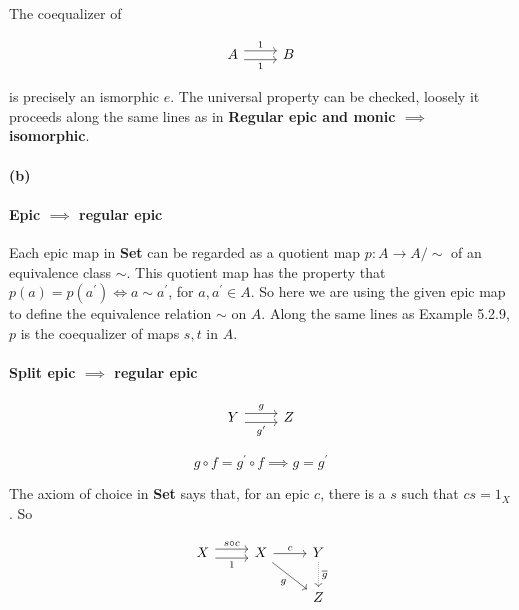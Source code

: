 \documentclass{article}
\begin{document}
The coequalizer of

\begin{equation*}
\label{eqn5143}
\begin{tikzcd}
 A \ar[r,shift left=.75ex,"1"]
   \ar[r,shift right=.75ex,swap,"1"] & B
\end{tikzcd}
\end{equation*}

is precisely an ismorphic $e$. The universal property can be checked, loosely it proceeds along the same lines as in \textbf{Regular epic and monic $\implies$ isomorphic}.

\paragraph{(b)}

\paragraph{Epic $\implies$ regular epic}

Each epic map in \textbf{Set} can be regarded as a quotient map $p \colon A \rightarrow A/\sim$ of an equivalence class $\sim$. This quotient map has the property that $p(a) = p(a^\prime) \iff a \sim a^\prime$, for $a,a^\prime \in A$. So here we are using the given epic map to define the equivalence relation $\sim$ on $A$. Along the same lines as Example 5.2.9, $p$ is the coequalizer of maps $s,t$ in $A$.

\paragraph{Split epic $\implies$ regular epic}

\begin{equation*}
\label{eqn5143}
\begin{tikzcd}
 Y \ar[r,shift left=.75ex,"g"]
   \ar[r,shift right=.75ex,swap,"g^\prime"] & Z
\end{tikzcd}
\end{equation*}

\begin{equation*}
  g \circ f = g^\prime \circ f \implies g = g^\prime
\end{equation*}

The axiom of choice in \textbf{Set} says that, for an epic $c$, there is a $s$ such that  $cs = 1_X$. So

\begin{equation*}
\begin{tikzcd}
X \ar[r,shift left=.75ex,"s \circ c"]
  \ar[r,shift right=.75ex,swap,"1"]
&
X \ar[r,"c"] \ar[dr,swap,"g"]
&
Y \ar[d,densely dotted, "\overline{g}"]
\\
& & Z
\end{tikzcd}
\end{equation*}
\end{document}
